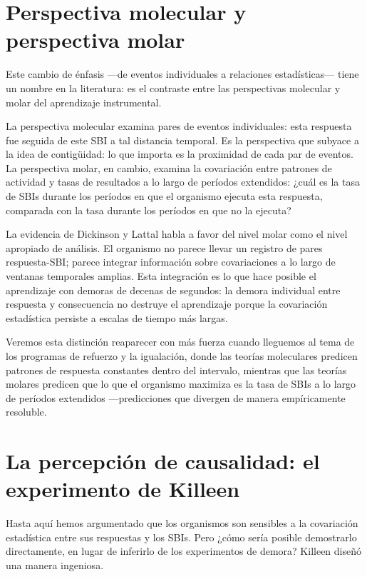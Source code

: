 \documentclass[
  letterpaper,
  DIV=11,
  numbers=noendperiod]{scrreprt}
\begin{document}
\begin{tcolorbox}[enhanced jigsaw, arc=.35mm, bottomrule=.15mm, breakable, colback=white, colframe=quarto-callout-note-color-frame, left=2mm, leftrule=.75mm, opacityback=0, rightrule=.15mm, toprule=.15mm]
\section{Perspectiva molecular y perspectiva
molar}\label{perspectiva-molecular-y-perspectiva-molar}

Este cambio de énfasis ---de eventos individuales a relaciones
estadísticas--- tiene un nombre en la literatura: es el contraste entre
las perspectivas molecular y molar del aprendizaje instrumental.

La perspectiva molecular examina pares de eventos individuales: esta
respuesta fue seguida de este SBI a tal distancia temporal. Es la
perspectiva que subyace a la idea de contigüidad: lo que importa es la
proximidad de cada par de eventos. La perspectiva molar, en cambio,
examina la covariación entre patrones de actividad y tasas de resultados
a lo largo de períodos extendidos: ¿cuál es la tasa de SBIs durante los
períodos en que el organismo ejecuta esta respuesta, comparada con la
tasa durante los períodos en que no la ejecuta?

La evidencia de Dickinson y Lattal habla a favor del nivel molar como el
nivel apropiado de análisis. El organismo no parece llevar un registro
de pares respuesta-SBI; parece integrar información sobre covariaciones
a lo largo de ventanas temporales amplias. Esta integración es lo que
hace posible el aprendizaje con demoras de decenas de segundos: la
demora individual entre respuesta y consecuencia no destruye el
aprendizaje porque la covariación estadística persiste a escalas de
tiempo más largas.

Veremos esta distinción reaparecer con más fuerza cuando lleguemos al
tema de los programas de refuerzo y la igualación, donde las teorías
moleculares predicen patrones de respuesta constantes dentro del
intervalo, mientras que las teorías molares predicen que lo que el
organismo maximiza es la tasa de SBIs a lo largo de períodos extendidos
---predicciones que divergen de manera empíricamente resoluble.

\section{La percepción de causalidad: el experimento de
Killeen}\label{la-percepciuxf3n-de-causalidad-el-experimento-de-killeen}

Hasta aquí hemos argumentado que los organismos son sensibles a la
covariación estadística entre sus respuestas y los SBIs. Pero ¿cómo
sería posible demostrarlo directamente, en lugar de inferirlo de los
experimentos de demora? Killeen diseñó una manera ingeniosa.


\end{tcolorbox}
\end{document}
